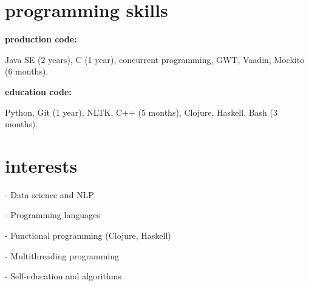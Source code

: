 \documentclass[]{friggeri-cv} %
\begin{document}
\section{programming skills}
\textbf{production code:}

Java SE (2 years), C (1 year), concurrent programming, GWT, Vaadin, Mockito (6 months).

\textbf{education code:}

Python, Git (1 year), NLTK, C++ (5 months), Clojure, Haskell, Bash (3 months).

\section{interests}

- Data science and NLP

- Programming languages

- Functional programming (Clojure, Haskell)

- Multithreading programming

- Self-education and algorithms

%
%
%
%
%
%

\end{document}
